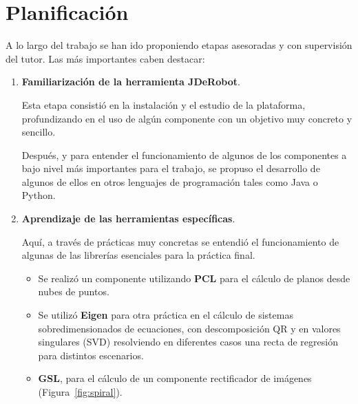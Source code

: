 \section{Planificación}

A lo largo del trabajo se han ido proponiendo etapas asesoradas y con supervisión del tutor. Las más importantes caben destacar:

\begin{enumerate}

\item \textbf{Familiarización de la herramienta JDeRobot}.

Esta etapa consistió en la instalación y el estudio de la plataforma, profundizando en el uso de algún componente con un objetivo muy concreto y sencillo.

Después, y para entender el funcionamiento de algunos de los componentes a bajo nivel más importantes para el trabajo, se propuso el desarrollo de algunos de ellos en otros lenguajes de programación tales como Java o Python.

\item \textbf{Aprendizaje de las herramientas específicas}.

Aquí, a través de prácticas muy concretas se entendió el funcionamiento de algunas de las librerías esenciales para la práctica final.

\begin{itemize}

\item Se realizó un componente utilizando \textbf{PCL} para el cálculo de planos desde nubes de puntos.

\item Se utilizó \textbf{Eigen} para otra práctica en el cálculo de sistemas sobredimensionados de ecuaciones, con descomposición QR y en valores singulares (SVD) resolviendo en diferentes casos una recta de regresión para distintos escenarios.

\item \textbf{GSL}, para el cálculo de un componente rectificador de imágenes (Figura~\ref{fig:spiral}).


\end{itemize}
\end{enumerate}
